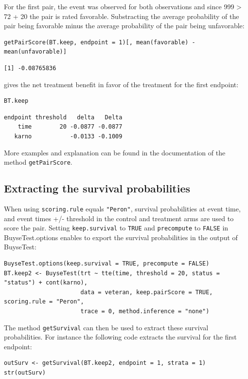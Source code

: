 \documentclass[12pt]{article}
\begin{document}
For the first pair, the event was observed for both observations and
since 999 > 72 + 20 the pair is rated favorable. Substracting the
average probability of the pair being favorable minus the average
probability of the pair being unfavorable:
\lstset{language=r,label= ,caption= ,captionpos=b,numbers=none}
\begin{lstlisting}
getPairScore(BT.keep, endpoint = 1)[, mean(favorable) - mean(unfavorable)]
\end{lstlisting}

\begin{verbatim}
[1] -0.08765836
\end{verbatim}


gives the net treatment benefit in favor of the treatment for the first
endpoint:
\lstset{language=r,label= ,caption= ,captionpos=b,numbers=none}
\begin{lstlisting}
BT.keep
\end{lstlisting}

\begin{verbatim}
endpoint threshold   delta   Delta
    time        20 -0.0877 -0.0877
   karno           -0.0133 -0.1009
\end{verbatim}


More examples and explanation can be found in the documentation of
the method \texttt{getPairScore}.

\subsection{Extracting the survival probabilities}
\label{sec:org155bfc2}
When using \texttt{scoring.rule} equals \texttt{"Peron"}, survival probabilities at
event time, and event times +/- threshold in the control and treatment
arms are used to score the pair. Setting \texttt{keep.survival} to \texttt{TRUE} and
\texttt{precompute} to \texttt{FALSE} in BuyseTest.options enables to export the
survival probabilities in the output of BuyseTest:
\lstset{language=r,label= ,caption= ,captionpos=b,numbers=none}
\begin{lstlisting}
BuyseTest.options(keep.survival = TRUE, precompute = FALSE)
BT.keep2 <- BuyseTest(trt ~ tte(time, threshold = 20, status = "status") + cont(karno),
                      data = veteran, keep.pairScore = TRUE, scoring.rule = "Peron",
                      trace = 0, method.inference = "none")
\end{lstlisting}

The method \texttt{getSurvival} can then be used to extract these survival
probabilities. For instance the following code extracts the survival
for the first endpoint:
\lstset{language=r,label= ,caption= ,captionpos=b,numbers=none}
\begin{lstlisting}
outSurv <- getSurvival(BT.keep2, endpoint = 1, strata = 1)
str(outSurv)
\end{lstlisting}
\end{document}
